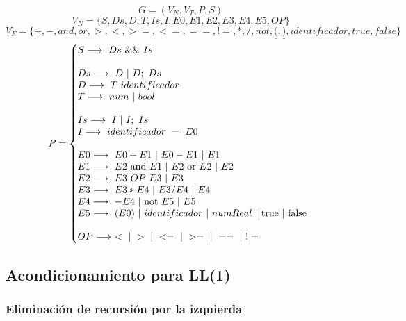 $$G = (V_N, V_T, P, S)$$
$$V_N = \{S, Ds, D, T, Is, I, E0, E1, E2, E3, E4, E5, OP\}$$
$$V_F = \{+, -, and, or, >, <, >=, <=, ==, !=, *, /, not, \underline{(}, \underline{)}, identificador, true, false\}$$
\begin{equation*}P =\left\{
\begin{array}{@{}ll@{}}
S \longrightarrow\ Ds\ \&\&\ Is\\
\\
Ds \longrightarrow\ D\ |\ D;\ Ds\\
D \longrightarrow\ T\ identificador\\
T \longrightarrow\ num\ |\ bool\\
\\
Is \longrightarrow\ I\ |\ I;\ Is\\
I \longrightarrow\ identificador\ =\ E0\\
\\
E0 \longrightarrow\ E0 + E1\ |\ E0 - E1\ |\ E1\\
E1 \longrightarrow\ E2\ \text{and}\ E1\ |\ E2\ \text{or}\ E2\ |\ E2\\
E2 \longrightarrow\ E3\ OP\ E3\ |\ E3\\
E3 \longrightarrow\ E3 * E4\ |\ E3 / E4\ |\ E4\\
E4 \longrightarrow\ -E4\ |\ \text{not}\ E5\ |\ E5\\
E5 \longrightarrow\ (E0)\ |\ identificador\ |\ numReal\ |\ \text{true}\ |\ \text{false}\\
\\
OP \longrightarrow\ <\ |\ >\ |\ <=\ |\ >=\ |\ ==\ |\ !=\\
\end{array}
\right .
\end{equation*}

\newpage
\subsection{Acondicionamiento para LL(1)}
\subsubsection{Eliminación de recursión por la izquierda}

